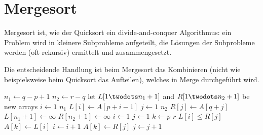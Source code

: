 \section{Mergesort}
\label{sec:alg-merging}

Mergesort ist, wie der Quicksort ein divide-and-conquer Algorithmus: ein Problem wird in kleinere Subprobleme aufgeteilt, die Lösungen der Subprobleme werden (oft rekursiv) ermittelt und zusammengesetzt.

Die entscheidende Handlung ist beim Mergesort das Kombinieren (nicht wie beispielsweise beim Quicksort das Aufteilen), welches in $\text{Merge}$ durchgeführt wird.

\begin{codebox}
    \li $n_1 \gets q - p + 1$ \label{ln:merge-subarr-length-1}
    \li $n_2 \gets r - q$ \label{ln:merge-subarr-length-2}
    \li let $L[1 \twodots n_1 + 1]$ and $R[1 \twodots n_2 + 1]$ be new arrays \label{ln:merge-subarr-creation}
    \li \For $i \gets 1$ \To $n_1$ \label{ln:merge-copy-begin}
    \li     \Do
                $L[i] \gets A[p + i - 1]$
            \End
    \li \For $j \gets 1$ \To $n_2$ \label{ln:merge-copy-for-2}
    \li     \Do
                $R[j] \gets A[q + j]$
            \End \label{ln:merge-copy-end}
    \li $L[n_1 + 1] \gets \infty$ \label{ln:merge-infty-assign-1}
    \li $R[n_2 + 1] \gets \infty$ \label{ln:merge-infty-assign-2}
    \li $i \gets 1$
    \li $j \gets 1$ \label{ln:merge-index-setup-2}
    \li \For $k \gets p$ \To $r$ \label{ln:merge-for-begin}
    \li     \Do
                \If $L[i] \leq R[j]$
                    \Then
    \li                 $A[k] \gets L[i]$
    \li                 $i \gets i + 1$
                    \Else
                        $A[k] \gets R[j]$
    \li                 $j \gets j + 1$
                    \End
            \End \label{ln:merge-for-end}
\end{codebox}

